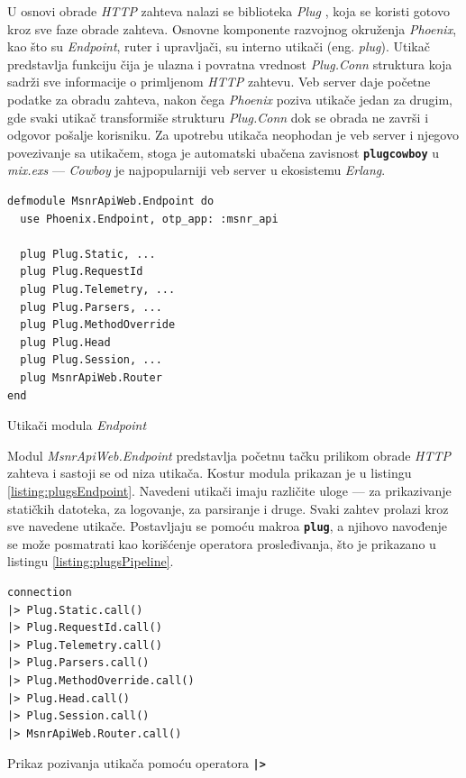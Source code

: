 \documentclass[12pt,oneside]{memoir}
\begin{document}
U osnovi obrade \emph{HTTP} zahteva nalazi se biblioteka \emph{Plug} \cite{plug}, koja se koristi gotovo kroz sve faze obrade zahteva.
Osnovne komponente razvojnog okruženja \emph{Phoenix}, kao što su \emph{Endpoint}, ruter i upravljači, su interno utikači (eng. \emph{plug}).
Utikač predstavlja funkciju čija je ulazna i povratna vrednost \emph{Plug.Conn} struktura koja sadrži sve informacije o
primljenom \emph{HTTP} zahtevu. Veb server daje početne podatke za obradu zahteva, nakon čega \emph{Phoenix} poziva utikače jedan za drugim,
gde svaki utikač transformiše strukturu \emph{Plug.Conn} dok se obrada ne završi i odgovor pošalje korisniku. Za upotrebu utikača neophodan je
veb server i njegovo povezivanje sa utikačem, stoga je automatski ubačena zavisnost \texttt{\textbf{plug{\textunderscore}cowboy}} u \emph{mix.exs}
--- \emph{Cowboy} je najpopularniji veb server u ekosistemu \emph{Erlang}.

\begin{listing}[!ht]
\begin{verbatim}
defmodule MsnrApiWeb.Endpoint do
  use Phoenix.Endpoint, otp_app: :msnr_api

  plug Plug.Static, ...
  plug Plug.RequestId
  plug Plug.Telemetry, ...
  plug Plug.Parsers, ...
  plug Plug.MethodOverride
  plug Plug.Head
  plug Plug.Session, ...
  plug MsnrApiWeb.Router
end
\end{verbatim}
\caption{Utikači modula \emph{Endpoint}}
\label{listing:plugsEndpoint}
\end{listing}
Modul \emph{MsnrApiWeb.Endpoint} predstavlja početnu tačku prilikom obrade \emph{HTTP} zahteva i sastoji se od niza utikača. Kostur
modula prikazan je u listingu \ref{listing:plugsEndpoint}. Navedeni utikači imaju različite uloge --- za prikazivanje statičkih datoteka, za logovanje,
za parsiranje i druge. Svaki zahtev prolazi kroz sve navedene utikače. Postavljaju se pomoću makroa \texttt{\textbf{plug}}, a njihovo
navođenje se može posmatrati kao korišćenje operatora prosleđivanja, što je prikazano u listingu \ref{listing:plugsPipeline}.
\begin{listing}[!h]
\begin{verbatim}
connection
|> Plug.Static.call()
|> Plug.RequestId.call()
|> Plug.Telemetry.call()
|> Plug.Parsers.call()
|> Plug.MethodOverride.call()
|> Plug.Head.call()
|> Plug.Session.call()
|> MsnrApiWeb.Router.call()
\end{verbatim}
\caption{Prikaz pozivanja utikača pomoću operatora \texttt{\textbf{|>}}}
\label{listing:plugsPipeline}
\end{listing}
\end{document}
